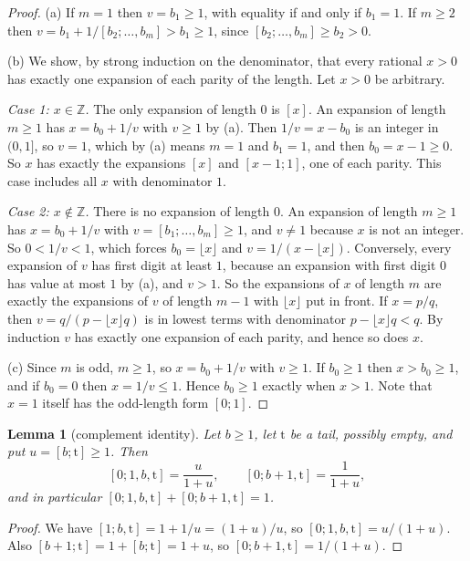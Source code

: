 \documentclass[11pt]{article}
\newtheorem{lemma}[theorem]{Lemma}
\theoremstyle{definition}
\theoremstyle{remark}
\newcommand{\Z}{\mathbb{Z}}
\begin{document}
\begin{proof}
(a) If $m=1$ then $v=b_1\ge1$, with equality if and only if $b_1=1$. If $m\ge2$ then
$v=b_1+1/[b_2;\dots,b_m]>b_1\ge1$, since $[b_2;\dots,b_m]\ge b_2>0$.

(b) We show, by strong induction on the denominator, that every rational $x>0$ has exactly one
expansion of each parity of the length. Let $x>0$ be arbitrary.

\emph{Case 1: $x\in\Z$.} The only expansion of length $0$ is $[x]$. An expansion of length $m\ge1$
has $x=b_0+1/v$ with $v\ge1$ by (a). Then $1/v=x-b_0$ is an integer in $(0,1]$, so $v=1$, which by
(a) means $m=1$ and $b_1=1$, and then $b_0=x-1\ge0$. So $x$ has exactly the expansions $[x]$ and
$[x-1;1]$, one of each parity. This case includes all $x$ with denominator $1$.

\emph{Case 2: $x\notin\Z$.} There is no expansion of length $0$. An expansion of length $m\ge1$ has
$x=b_0+1/v$ with $v=[b_1;\dots,b_m]\ge1$, and $v\neq1$ because $x$ is not an integer. So $0<1/v<1$,
which forces $b_0=\lfloor x\rfloor$ and $v=1/(x-\lfloor x\rfloor)$. Conversely, every expansion of
$v$ has first digit at least $1$, because an expansion with first digit $0$ has value at most $1$
by (a), and $v>1$. So the expansions of $x$ of length $m$ are exactly the expansions of $v$ of
length $m-1$ with $\lfloor x\rfloor$ put in front. If $x=p/q$, then
$v=q/(p-\lfloor x\rfloor q)$ is in lowest terms with denominator $p-\lfloor x\rfloor q<q$. By
induction $v$ has exactly one expansion of each parity, and hence so does $x$.

(c) Since $m$ is odd, $m\ge1$, so $x=b_0+1/v$ with $v\ge1$. If $b_0\ge1$ then $x>b_0\ge1$, and if
$b_0=0$ then $x=1/v\le1$. Hence $b_0\ge1$ exactly when $x>1$. Note that $x=1$ itself has the
odd-length form $[0;1]$.
\end{proof}

\begin{lemma}[complement identity]\label{lem:compl}
Let $b\ge1$, let $\mathrm{t}$ be a tail, possibly empty, and put $u=[b;\mathrm{t}]\ge1$. Then
\[
[0;1,b,\mathrm{t}]=\frac{u}{1+u},\qquad [0;b+1,\mathrm{t}]=\frac{1}{1+u},
\]
and in particular $[0;1,b,\mathrm{t}]+[0;b+1,\mathrm{t}]=1$.
\end{lemma}

\begin{proof}
We have $[1;b,\mathrm{t}]=1+1/u=(1+u)/u$, so $[0;1,b,\mathrm{t}]=u/(1+u)$. Also
$[b+1;\mathrm{t}]=1+[b;\mathrm{t}]=1+u$, so $[0;b+1,\mathrm{t}]=1/(1+u)$.
\end{proof}
\end{document}
